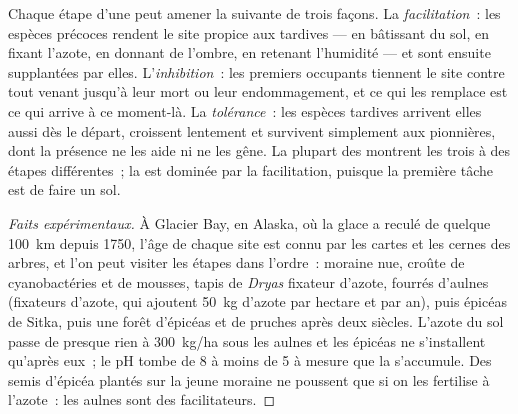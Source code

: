 \begin{proposition}\label{prop:b1:ecosystem-dynamics:mechanisms}
Chaque étape d'une  peut amener la suivante de trois façons.
La \emph{facilitation}~: les espèces précoces rendent le site propice
aux tardives --- en bâtissant du sol, en fixant l'azote, en donnant de
l'ombre, en retenant l'humidité --- et sont ensuite supplantées par
elles. L'\emph{inhibition}~: les premiers occupants tiennent le site
contre tout venant jusqu'à leur mort ou leur endommagement, et ce qui
les remplace est ce qui arrive à ce moment-là. La
\emph{tolérance}~: les espèces tardives arrivent elles aussi dès le
départ, croissent lentement et survivent simplement aux pionnières,
dont la présence ne les aide ni ne les gêne. La plupart des 
montrent les trois à des étapes différentes~; la  est
dominée par la facilitation, puisque la première tâche est de faire un
sol.
\end{proposition}
\begin{proof}[Faits expérimentaux]
À Glacier Bay, en Alaska, où la glace a reculé de quelque \qty{100}{km}
depuis 1750, l'âge de chaque site est connu par les cartes et les
cernes des arbres, et l'on peut visiter les étapes dans l'ordre~: moraine
nue, croûte de cyanobactéries et de mousses, tapis de \emph{Dryas}
fixateur d'azote, fourrés d'aulnes (fixateurs d'azote, qui ajoutent
\qty{50}{kg} d'azote par hectare et par an), puis épicéas de Sitka,
puis une forêt d'épicéas et de pruches après deux siècles. L'azote du
sol passe de presque rien à \qty{300}{kg/ha} sous les aulnes et les
épicéas ne s'installent qu'après eux~; le pH tombe de 8 à moins de 5 à
mesure que la  s'accumule. Des semis d'épicéa plantés sur la
jeune moraine ne poussent que si on les fertilise à l'azote~: les
aulnes sont des facilitateurs.
\end{proof}

